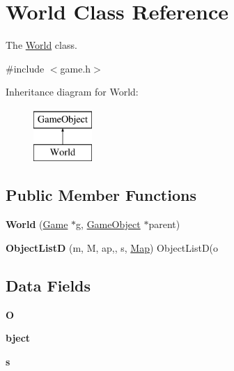 \hypertarget{class_world}{\section{\-World \-Class \-Reference}
\label{class_world}
}


\-The \hyperlink{class_world}{\-World} class.  




{\ttfamily \#include $<$game.\-h$>$}

\-Inheritance diagram for \-World\-:\begin{figure}[H]
\begin{center}
\leavevmode
\includegraphics[height=2.000000cm]{class_world}
\end{center}
\end{figure}
\subsection*{\-Public \-Member \-Functions}
\begin{DoxyCompactItemize}
\item 
\hypertarget{class_world_a8f2e7de9a7533ed84dbff13b73ab77ef}{{\bfseries \-World} (\hyperlink{class_game}{\-Game} $\ast$g, \hyperlink{class_game_object}{\-Game\-Object} $\ast$parent)}\label{class_world_a8f2e7de9a7533ed84dbff13b73ab77ef}

\item 
\hypertarget{class_world_a7fe6abb143814e0f87145648982f46af}{{\bfseries \-Object\-List\-D} (m, \-M, ap,, s, \hyperlink{class_map}{\-Map}) \-Object\-List\-D(o}\label{class_world_a7fe6abb143814e0f87145648982f46af}

\end{DoxyCompactItemize}
\subsection*{\-Data \-Fields}
\begin{DoxyCompactItemize}
\item 
\hypertarget{class_world_a180c9e33dc6e59ca8e097bc9e6a36503}{{\bfseries \-O}}\label{class_world_a180c9e33dc6e59ca8e097bc9e6a36503}

\item 
\hypertarget{class_world_a2c3ed57fb27e57a197a2218f196950e2}{{\bfseries bject}}\label{class_world_a2c3ed57fb27e57a197a2218f196950e2}

\item 
\hypertarget{class_world_a985aab8b792338c2a1718f4ec46f88dc}{{\bfseries s}}\label{class_world_a985aab8b792338c2a1718f4ec46f88dc}

\end{DoxyCompactItemize}


